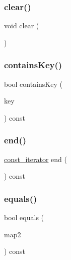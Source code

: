 \subsubsection{\texorpdfstring{clear()}{clear()}}
{\footnotesize\ttfamily void clear (\begin{DoxyParamCaption}{ }\end{DoxyParamCaption})}

\mbox{\label{classLinkedHashMap_a37473445b6725c5f0fc59a32ea2e645e}} 
\subsubsection{\texorpdfstring{contains\+Key()}{containsKey()}}
{\footnotesize\ttfamily bool contains\+Key (\begin{DoxyParamCaption}\item[{const Key\+Type \&}]{key }\end{DoxyParamCaption}) const}

\mbox{\label{classLinkedHashMap_accf9a4bd0c34d4a5f6a7dab66ea10cdc}} 
\subsubsection{\texorpdfstring{end()}{end()}}
{\footnotesize\ttfamily \mbox{\hyperlink{classLinkedHashMap_a40260d13231ddfc81d864ded4ad05c45}{const\+\_\+iterator}} end (\begin{DoxyParamCaption}{ }\end{DoxyParamCaption}) const\hspace{0.3cm}{\ttfamily [inline]}}

\mbox{\label{classLinkedHashMap_ad02a403a51be973f5e44812f9b7d897a}} 
\subsubsection{\texorpdfstring{equals()}{equals()}}
{\footnotesize\ttfamily bool equals (\begin{DoxyParamCaption}\item[{const \mbox{\hyperlink{classLinkedHashMap}{Linked\+Hash\+Map}}$<$ Key\+Type, Value\+Type $>$ \&}]{map2 }\end{DoxyParamCaption}) const}

